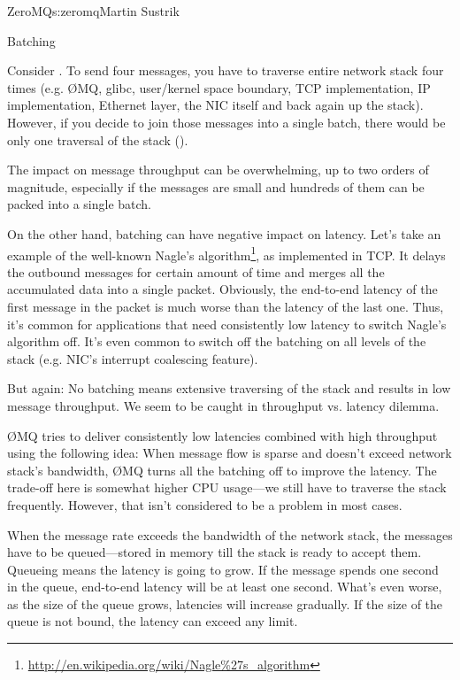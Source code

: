 \begin{aosachapter}{ZeroMQ}{s:zeromq}{Martin Sustrik}
\begin{aosasect1}{Batching}

Consider .  To send four messages, you
have to traverse entire network stack four times (e.g. {\O}MQ, glibc,
user/kernel space boundary, TCP implementation, IP implementation,
Ethernet layer, the NIC itself and back again up the stack). However,
if you decide to join those messages into a single batch, there would
be only one traversal of the stack
().


The impact on message throughput can be overwhelming, up to two orders
of magnitude, especially if the messages are small and hundreds of
them can be packed into a single batch.

On the other hand, batching can have negative impact on latency. Let's
take an example of the well-known Nagle's
algorithm\footnote{\url{http://en.wikipedia.org/wiki/Nagle\%27s_algorithm}},
as implemented in TCP. It delays the outbound messages for certain
amount of time and merges all the accumulated data into a single
packet. Obviously, the end-to-end latency of the first message in the
packet is much worse than the latency of the last one. Thus, it's
common for applications that need consistently low latency to switch
Nagle's algorithm off. It's even common to switch off the batching on
all levels of the stack (e.g. NIC's interrupt coalescing feature).

But again: No batching means extensive traversing of the stack and
results in low message throughput. We seem to be caught in throughput
vs. latency dilemma.

{\O}MQ tries to deliver consistently low latencies combined with high
throughput using the following idea: When message flow is sparse and
doesn't exceed network stack's bandwidth, {\O}MQ turns all the batching
off to improve the latency. The trade-off here is somewhat higher CPU
usage---we still have to traverse the stack frequently. However, that
isn't considered to be a problem in most cases.

When the message rate exceeds the bandwidth of the network stack, the
messages have to be queued---stored in memory till the stack is ready
to accept them. Queueing means the latency is going to grow. If the
message spends one second in the queue, end-to-end latency will be at
least one second. What's even worse, as the size of the queue grows,
latencies will increase gradually. If the size of the queue is not
bound, the latency can exceed any limit.


\end{aosasect1}
\end{aosachapter}
